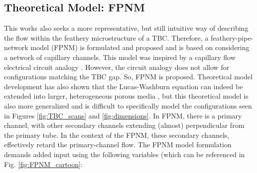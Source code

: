 \documentclass[%
 aip,
 amsmath,amssymb,
 reprint,%
]{revtex4-1}
\begin{document}



\subsection{Theoretical Model: FPNM}
\label{sec:pipeNetworkMethod}
This works also seeks a more representative, but still intuitive way of describing the flow within the feathery microstructure of a TBC. Therefore, a feathery-pipe-network model (FPNM)  is formulated and proposed and is based on considering a network of capillary channels. This model was inspired by a capillary flow electrical circuit analogy \cite{Mikaelian2020}. However, the circuit analogy does not allow for configurations matching the TBC gap. So, FPNM is proposed. Theoretical model development has also shown that the Lucas-Washburn equation can indeed be extended into larger, heterogeneous porous media \cite{Cai2021, WAGHMARE2010561}, but this theoretical model is also more generalized and is difficult to specifically model the configurations seen in Figures \ref{fig:TBC_scans} and \ref{fig:dimensions}.
In FPNM, there is a primary channel, with other secondary channels extending (almost) perpendicular from the primary tube. In the context of the FPNM, these secondary channels, effectively retard the primary-channel flow. The FPNM model formulation demands added input using the following variables (which can be referenced in Fig. \ref{fig:FPNM_cartoon}:
\end{document}
